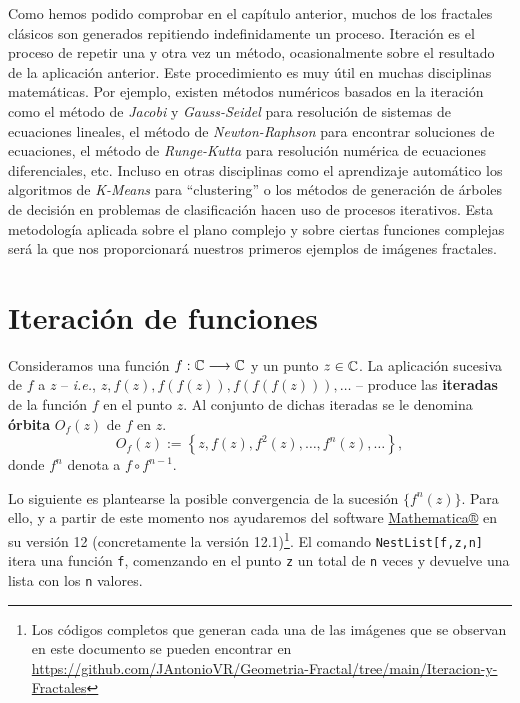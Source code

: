 
Como hemos podido comprobar en el capítulo anterior, muchos de los fractales clásicos son generados repitiendo indefinidamente un proceso. Iteración es el proceso de repetir una y otra vez un método, ocasionalmente sobre el resultado de la aplicación anterior. Este procedimiento es muy útil en muchas disciplinas matemáticas. Por ejemplo, existen métodos numéricos basados en la iteración como el método de \textit{Jacobi} y \textit{Gauss-Seidel} para resolución de sistemas de ecuaciones lineales, el método de \textit{Newton-Raphson} para encontrar soluciones de ecuaciones, el método de \textit{Runge-Kutta} para resolución numérica de ecuaciones diferenciales, etc. Incluso en otras disciplinas como el aprendizaje automático los algoritmos de \textit{K-Means} para ``clustering'' o los métodos de generación de árboles de decisión en problemas de clasificación hacen uso de procesos iterativos. Esta metodología aplicada sobre el plano complejo y sobre ciertas funciones complejas será la que nos proporcionará nuestros primeros ejemplos de imágenes fractales.

\section{Iteración de funciones}
\begin{definicion}
    Consideramos una función $f:\mathbb{C}\longrightarrow\mathbb{C}$ y un punto $z\in\mathbb{C}$. La aplicación sucesiva de $f$ a $z$ -- \textit{i.e.}, $z,f(z),f(f(z)), f(f(f(z))),\dots$ -- produce las \textbf{iteradas} de la función $f$ en el punto $z$. Al conjunto de dichas iteradas se le denomina \textbf{órbita} $O_f(z)$ de $f$ en $z$.
    $$
    O_f(z):=\left\lbrace z, f(z), f^2(z), \dots, f^n(z), \dots\right\rbrace,
    $$
    donde $f^n$ denota a $f\circ f^{n-1}$.
\end{definicion}

Lo siguiente es plantearse la posible convergencia de la sucesión $\{f^n(z)\}$. Para ello, y a partir de este momento nos ayudaremos del software \textcolor{blue}{\href{https://www.wolfram.com/mathematica/}{Mathematica®}} en su versión 12 (concretamente la versión 12.1)\footnote{Los códigos completos que generan cada una de las imágenes que se observan en este documento se pueden encontrar en \url{https://github.com/JAntonioVR/Geometria-Fractal/tree/main/Iteracion-y-Fractales}}. El comando \verb|NestList[f,z,n]| itera una función \verb|f|, comenzando en el punto \verb|z| un total de \verb|n| veces y devuelve una lista con los \verb|n| valores. 

